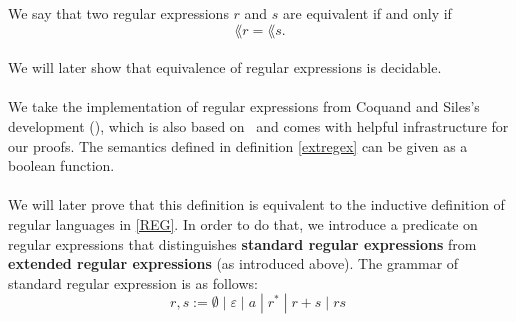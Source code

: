     \begin{definition}
        We say that two regular expressions $r$ and $s$ are equivalent if and only if
        \begin{equation*}
            \lang{r} = \lang{s}.
        \end{equation*}
    \end{definition}

    \paragraph{}
    We will later show that equivalence of regular expressions is decidable.


    \paragraph{}
    We take the implementation of regular expressions from Coquand and Siles's development (\cite{DBLP:conf/cpp/CoquandS11}), which is also based on \ssreflect\ and comes with helpful infrastructure for our proofs.
    The semantics defined in definition \ref{extregex} can be given as a boolean function.
    


    \paragraph{}
    We will later prove that this definition is equivalent to the inductive definition of regular languages in \ref{REG}.
    In order to do that, we introduce a predicate on regular expressions that distinguishes \textbf{standard regular expressions} 
    from \textbf{extended regular expressions} (as introduced above).
    The grammar of standard regular expression is as follows:
    \begin{equation*}
        r,s := \emptyset \; | \; \varepsilon \; | \; a \; | \; r^* \; | \; r + s \; | \; r s \; 
    \end{equation*}




